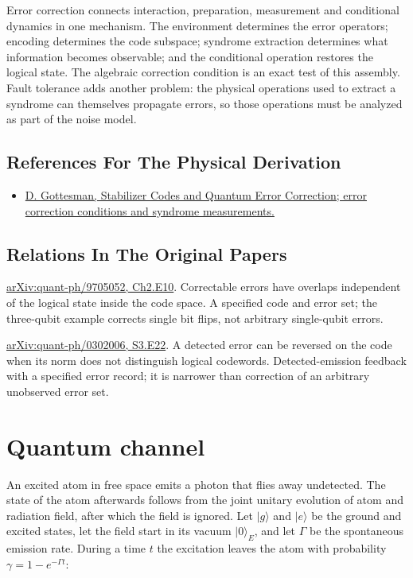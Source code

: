 \documentclass[11pt,oneside]{book}
\begin{document}
Error correction connects interaction, preparation, measurement and conditional dynamics in one mechanism. The environment determines the error operators; encoding determines the code subspace; syndrome extraction determines what information becomes observable; and the conditional operation restores the logical state. The algebraic correction condition is an exact test of this assembly. Fault tolerance adds another problem: the physical operations used to extract a syndrome can themselves propagate errors, so those operations must be analyzed as part of the noise model.

\subsection*{References For The Physical Derivation}
\begin{itemize}
\item \href{https://arxiv.org/abs/quant-ph/9705052}{D. Gottesman, Stabilizer Codes and Quantum Error Correction; error correction conditions and syndrome measurements.}
\end{itemize}

\subsection*{Relations In The Original Papers}

\href{https://arxiv.org/html/quant-ph/9705052#Ch2.E10}{arXiv:quant-ph/9705052, Ch2.E10}. Correctable errors have overlaps independent of the logical state inside the code space. A specified code and error set; the three-qubit example corrects single bit flips, not arbitrary single-qubit errors.

\href{https://arxiv.org/html/quant-ph/0302006#S3.E22}{arXiv:quant-ph/0302006, S3.E22}. A detected error can be reversed on the code when its norm does not distinguish logical codewords. Detected-emission feedback with a specified error record; it is narrower than correction of an arbitrary unobserved error set.



\clearpage

\section{Quantum channel}

\label{topic:quantum-channel}

An excited atom in free space emits a photon that flies away undetected. The state of the atom afterwards follows from the joint unitary evolution of atom and radiation field, after which the field is ignored. Let \(|g\rangle\) and \(|e\rangle\) be the ground and excited states, let the field start in its vacuum \(|0\rangle_E\), and let \(\Gamma\) be the spontaneous emission rate. During a time \(t\) the excitation leaves the atom with probability \(\gamma=1-e^{-\Gamma t}\):
\end{document}
